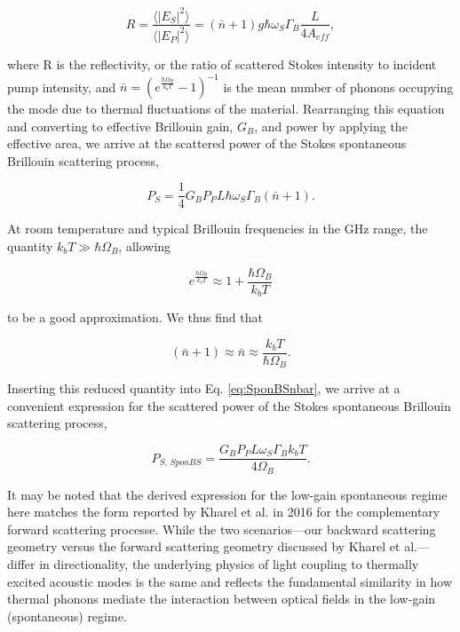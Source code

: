 \begin{equation}
  R = \frac{\langle|E_{S}|^{2}\rangle}{\langle|E_{P}|^{2}\rangle} = (\bar{n} + 1)g\hbar\omega_{S}\Gamma_{B}\frac{L}{4A_{eff}},
\end{equation}

where R is the reflectivity, or the ratio of scattered Stokes intensity to incident pump intensity, and $\bar{n} = (e^{\frac{\hbar\Omega_{B}}{k_{b}T}} - 1)^{-1}$ is the mean number of phonons occupying the mode due to thermal fluctuations of the material. Rearranging this equation and converting to effective Brillouin gain, $G_{B}$, and power by applying the effective area, we arrive at the scattered power of the Stokes spontaneous Brillouin scattering process,

\begin{equation}
  P_S = \frac{1}{4}G_{B}P_{P}L\hbar\omega_{S}\Gamma_{B}(\bar{n} + 1).
  \label{eq:SponBSnbar}
\end{equation}

At room temperature and typical Brillouin frequencies in the GHz range, the quantity $k_{b}T \gg \hbar\Omega_{B}$, allowing

\begin{equation}
e^{\frac{\hbar\Omega_{B}}{k_{b}T}} \approx 1 + \frac{\hbar\Omega_{B}}{k_{b}T}
\end{equation}

to be a good approximation. We thus find that

\begin{equation}
(\bar{n} + 1) \approx \bar{n} \approx \frac{k_{b}T}{\hbar\Omega_{B}}.
\end{equation}

Inserting this reduced quantity into Eq. \ref{eq:SponBSnbar}, we arrive at a convenient expression for the scattered power of the Stokes spontaneous Brillouin scattering process,

\begin{equation}
  P_{S, \,\textit{SponBS}} = \frac{G_{B}P_{P}L\omega_{S}\Gamma_{B}k_{b}T}{4\Omega_{B}}.
\end{equation}

It may be noted that the derived expression for the low-gain spontaneous regime here matches the form reported by Kharel et al. in 2016 \cite{kharel2016noise} for the complementary forward scattering processe. While the two scenarios—our backward scattering geometry versus the forward scattering geometry discussed by Kharel et al.—differ in directionality, the underlying physics of light coupling to thermally excited acoustic modes is the same and reflects the fundamental similarity in how thermal phonons mediate the interaction between optical fields in the low-gain (spontaneous) regime.


